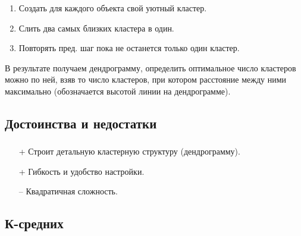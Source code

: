 \documentclass[t,aspectratio=169]{beamer}  %
\begin{document}
\begin{frame}
    \frametitle{\insertsection} 
    \framesubtitle{\insertsubsection}
    \begin{enumerate}
        \item Создать для каждого объекта свой уютный кластер.
        \item Слить два самых близких кластера в один.
        \item Повторять пред. шаг пока не останется только один кластер.
    \end{enumerate}   
    В результате получаем дендрограмму, определить оптимальное число кластеров можно по ней, взяв то число кластеров, при котором расстояние между ними максимально (обозначается высотой линии на дендрограмме).
\end{frame}

\begin{frame}
    \frametitle{\insertsection} 
    \framesubtitle{\insertsubsection}
\end{frame}

\subsection{Достоинства и недостатки}

\begin{frame}
    \frametitle{\insertsection} 
    \framesubtitle{\insertsubsection}
    \begin{itemize}
        \item[+] Строит детальную кластерную структуру (дендрограмму).
        \item[+] Гибкость и удобство настройки.
        \item[--] Квадратичная сложность.
    \end{itemize}
\end{frame}

\subsection{К-средних}
\end{document}
